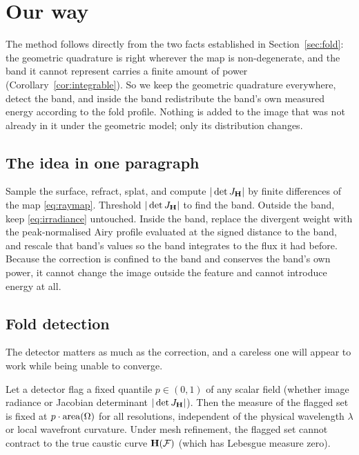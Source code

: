 \section{Our way}
\label{sec:ourway}

The method follows directly from the two facts established in
Section~\ref{sec:fold}: the geometric quadrature is right wherever the map is
non-degenerate, and the band it cannot represent carries a finite amount of
power (Corollary~\ref{cor:integrable}). So we keep the geometric quadrature
everywhere, detect the band, and inside the band redistribute the band's own
measured energy according to the fold profile. Nothing is added to the image
that was not already in it under the geometric model; only its distribution
changes.

\subsection{The idea in one paragraph}
\label{sec:ours-idea}

Sample the surface, refract, splat, and compute $|\det J_{\mathbf{H}}|$ by finite differences
of the map \eqref{eq:raymap}. Threshold $|\det J_{\mathbf{H}}|$ to find the band. Outside the
band, keep \eqref{eq:irradiance} untouched. Inside the band, replace the
divergent weight with the peak-normalised Airy profile evaluated at the signed
distance to the band, and rescale that band's values so the band integrates to
the flux it had before. Because the correction is confined to the band and
conserves the band's own power, it cannot change the image outside the feature
and cannot introduce energy at all.

\subsection{Fold detection}
\label{sec:ours-detect}

The detector matters as much as the correction, and a careless one will appear
to work while being unable to converge.

\begin{lemma}
\label{lem:quantiledetector}
Let a detector flag a fixed quantile $p \in (0, 1)$ of any scalar field (whether image
radiance or Jacobian determinant $|\det J_{\mathbf{H}}|$). Then the measure of the flagged set is
fixed at $p \cdot \operatorname{area}(\Omega)$ for all resolutions, independent of the
physical wavelength $\lambda$ or local wavefront curvature. Under mesh refinement,
the flagged set cannot contract to the true caustic curve $\mathbf{H}(\mathcal{F})$ (which has
Lebesgue measure zero).
\end{lemma}

